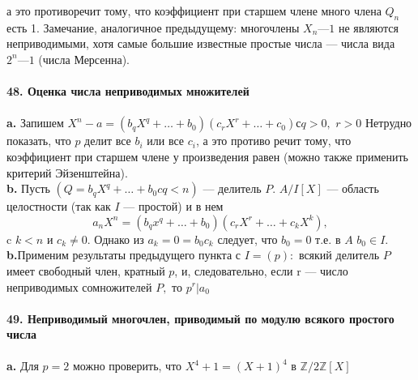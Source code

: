 \documentclass{mai_book}
\begin{document}
\pagebreak
\noindent а это противоречит тому, что коэффициент при старшем члене много­\linebreak
члена $Q_n$ есть 1. Замечание, аналогичное предыдущему: многочлены\linebreak
$X_n — 1$ не являются неприводимыми, хотя самые большие известные\linebreak
простые числа — числа вида $2^{n} — 1$ (числа Мерсенна).\\
\\
\noindent\textbf{48. Оценка числа неприводимых множителей}\\
\\
\hspace*{15pt}\textbf{a.} Запишем $X^{n} - a = (b_{q}X^{q}+\ldots+ b_0)(c_{r}X^r+\ldots+c_0) с q > 0,$\linebreak
$r > 0$ Нетрудно показать, что $p$ делит все $b_i$ или все $c_i$, а это противо­\linebreak
речит тому, что коэффициент при старшем члене у произведения равен (можно также применить критерий Эйзенштейна).\\
\hspace*{15pt}\textbf{b.} Пусть $(Q = b_{q}X^{q}+\ldots+b_0 c q< n)$ --- делитель $P$. $A/I[X]$ ---\linebreak
область целостности (так как $I$ --- простой) и в нем
$$a_{n}X^{n} = (b_{q}x^{q}+\ldots+b_0)(c_{r}X^{r}+\ldots+c_{k}X^{k}),$$
c $k < n$ и $c_k \neq 0.$ Однако из $a_k = 0 = b_{0}c_k$ следует, что $b_0 = 0 $ т.е. в $A$\linebreak
$b_0 \in I.$\\
\hspace*{15pt}\textbf{b.}Применим результаты предыдущего пункта с $I = (p):$ всякий\linebreak
делитель $P$ имеет свободный член, кратный $p$, и, следовательно, если\linebreak 
r --- число неприводимых сомножителей $P,$ то $p^r | a_0$\\
\\
\indent\textbf{49. Неприводимый многочлен, приводимый по модулю
всякого простого числа}\\
\\
\hspace*{15pt}\textbf{a.} Для $p = 2$ можно проверить, что $X^{4} + 1 = (X + 1)^{4}$ в $\mathbb{Z}/2\mathbb{Z}[X]$\\
\end{document}
